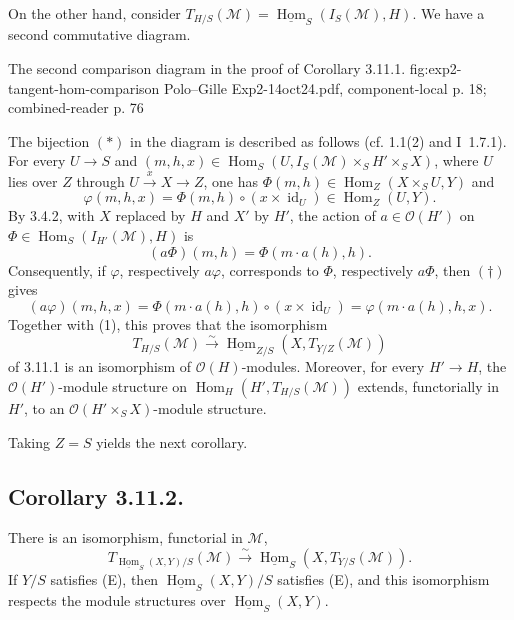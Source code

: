 On the other hand, consider
\(T_{H/S}(\mathcal M)=\underline{\operatorname{Hom}}_S
  (I_S(\mathcal M),H)\). We have a second commutative diagram.

  {The second comparison diagram in the proof of Corollary 3.11.1.}
  {fig:exp2-tangent-hom-comparison}
  {Polo--Gille Exp2-14oct24.pdf, component-local p. 18; combined-reader p. 76}

The bijection \((*)\) in the diagram is described as follows (cf. 1.1(2)
and I~1.7.1). For every \(U\to S\) and
\((m,h,x)\in\operatorname{Hom}_S
  (U,I_S(\mathcal M)\times_SH'\times_SX)\), where \(U\) lies over \(Z\)
through \(U\xrightarrow{x}X\to Z\), one has
\(\Phi(m,h)\in\operatorname{Hom}_Z(X\times_SU,Y)\) and
\begin{equation}
  \varphi(m,h,x)=\Phi(m,h)\circ(x\times\operatorname{id}_U)
  \in\operatorname{Hom}_Z(U,Y).
  \tag{$\dagger$}
\end{equation}
By 3.4.2, with \(X\) replaced by \(H\) and \(X'\) by \(H'\), the
action of \(a\in\mathcal O(H')\) on
\(\Phi\in\operatorname{Hom}_S(I_{H'}(\mathcal M),H)\) is
\[
  (a\Phi)(m,h)=\Phi(m\cdot a(h),h).
\]
Consequently, if \(\varphi\), respectively \(a\varphi\), corresponds to
\(\Phi\), respectively \(a\Phi\), then \((\dagger)\) gives
\begin{equation}
  (a\varphi)(m,h,x)
  =\Phi(m\cdot a(h),h)\circ(x\times\operatorname{id}_U)
  =\varphi(m\cdot a(h),h,x).
  \tag{2}
\end{equation}
Together with (1), this proves that the isomorphism
\[
  T_{H/S}(\mathcal M)
  \xrightarrow{\sim}
  \underline{\operatorname{Hom}}_{Z/S}
    (X,T_{Y/Z}(\mathcal M))
\]
of 3.11.1 is an isomorphism of \(\mathcal O(H)\)-modules. Moreover, for
every \(H'\to H\), the \(\mathcal O(H')\)-module structure on
\(\operatorname{Hom}_H(H',T_{H/S}(\mathcal M))\) extends, functorially in
\(H'\), to an \(\mathcal O(H'\times_SX)\)-module structure.

Taking \(Z=S\) yields the next corollary.

\subsection*{Corollary 3.11.2.}
There is an isomorphism, functorial in \(\mathcal M\),
\[
  T_{\underline{\operatorname{Hom}}_S(X,Y)/S}(\mathcal M)
  \xrightarrow{\sim}
  \underline{\operatorname{Hom}}_S(X,T_{Y/S}(\mathcal M)).
\]
If \(Y/S\) satisfies (E), then
\(\underline{\operatorname{Hom}}_S(X,Y)/S\) satisfies (E), and this
isomorphism respects the module structures over
\(\underline{\operatorname{Hom}}_S(X,Y)\).

